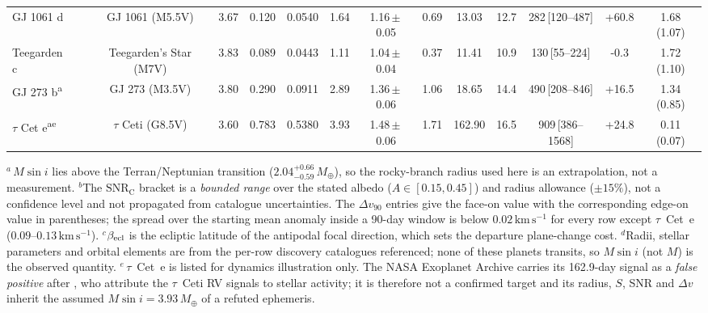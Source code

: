 \begin{table}[t]
{{\begin{tabular}{lccccccccccccc}
GJ 1061 d & \citet{dreizler20} & GJ 1061 (M5.5V) & 3.67 & 0.120 & 0.0540 & 1.64 & 1.16\,$\pm$\,0.05 & 0.69 & 13.03 & 12.7 & 282\,[120--487] & +60.8 & 1.68 (1.07) \\
Teegarden c & \citet{dreizler24} & Teegarden's Star (M7V) & 3.83 & 0.089 & 0.0443 & 1.11 & 1.04\,$\pm$\,0.04 & 0.37 & 11.41 & 10.9 & 130\,[55--224] & -0.3 & 1.72 (1.10) \\
GJ 273 b\textsuperscript{a} & \citet{astudillo17} & GJ 273 (M3.5V) & 3.80 & 0.290 & 0.0911 & 2.89 & 1.36\,$\pm$\,0.06 & 1.06 & 18.65 & 14.4 & 490\,[208--846] & +16.5 & 1.34 (0.85) \\
$\tau$ Cet e\textsuperscript{a}\textsuperscript{e} & \citet{feng17} & $\tau$ Ceti (G8.5V) & 3.60 & 0.783 & 0.5380 & 3.93 & 1.48\,$\pm$\,0.06 & 1.71 & 162.90 & 16.5 & 909\,[386--1568] & +24.8 & 0.11 (0.07) \\
\bottomrule
\end{tabular}
}
}

\vspace{1mm}
\parbox{0.96\textwidth}{\footnotesize
\textbf{$^{a}$}\,$M\sin i$ lies above the \citet{chenkipping17} Terran/Neptunian transition ($2.04^{+0.66}_{-0.59}\,M_\oplus$), so the rocky-branch radius used here is an extrapolation, not a measurement.
\textbf{$^{b}$}The $\mathrm{SNR_C}$ bracket is a \emph{bounded range} over the stated albedo ($A\in[0.15,0.45]$) and radius allowance ($\pm15\%$), not a confidence level and not propagated from catalogue uncertainties. The $\Delta v_{90}$ entries give the face-on value with the corresponding edge-on value in parentheses; the spread over the starting mean anomaly inside a 90-day window is below $0.02\,\mathrm{km\,s^{-1}}$ for every row except $\tau$~Cet~e ($0.09$--$0.13\,\mathrm{km\,s^{-1}}$).
\textbf{$^{c}$}$\beta_{\rm ecl}$ is the ecliptic latitude of the antipodal focal direction, which sets the departure plane-change cost.
\textbf{$^{d}$}Radii, stellar parameters and orbital elements are from the per-row discovery catalogues referenced; none of these planets transits, so $M\sin i$ (not $M$) is the observed quantity.
\textbf{$^{e}$}\,$\tau$~Cet~e is listed for dynamics illustration only. The NASA Exoplanet Archive carries its 162.9-day signal as a \emph{false positive} after \citet{figueira25}, who attribute the $\tau$~Ceti RV signals to stellar activity; it is therefore not a confirmed target and its radius, $S$, SNR and $\Delta v$ inherit the assumed $M\sin i = 3.93\,M_\oplus$ of a refuted ephemeris.
}
\end{table}
